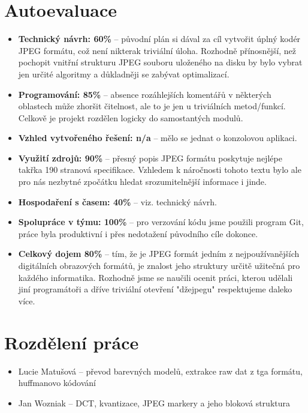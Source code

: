\documentclass[a4paper,11pt]{article}
\begin{document}
\section{Autoevaluace}
\begin{itemize}
\item \textbf{Technický návrh: 60\%} -- původní plán si dával za cíl vytvořit úplný kodér JPEG formátu, což
				není nikterak triviální úloha. Rozhodně přínosnější, než pochopit vnitřní strukturu JPEG
				souboru uloženého na disku by bylo vybrat jen určité algoritmy a důkladněji se zabývat
				optimalizací.
\item \textbf{Programování: 85\%} -- absence rozáhlejších komentářů v některých oblastech může zhoršit čitelnost,
				ale to je jen u triviálních metod/funkcí. Celkově je projekt rozdělen logicky do samostantých
				modulů.
\item \textbf{Vzhled vytvořeného řešení: n/a} -- mělo se jednat o konzolovou aplikaci.
\item \textbf{Využití zdrojů: 90\%} -- přesný popis JPEG formátu poskytuje nejlépe takřka 190 stranová 
				specifikace. Vzhledem k náročnosti tohoto textu bylo ale pro nás nezbytné zpočátku hledat 
				srozumitelnější	informace i jinde.
\item \textbf{Hospodaření s časem: 40\%} -- viz. technický návrh.
\item \textbf{Spolupráce v týmu: 100\%} -- pro verzování kódu jsme použili program Git, práce byla produktivní
				i přes nedotažení původního cíle dokonce.
\item \textbf{Celkový dojem 80\%} -- tím, že je JPEG formát jedním z nejpoužívanějších digitálních obrazových
				formátů, je znalost jeho struktury určitě užitečná pro každého informatika. Rozhodně
				jsme se naučili ocenit práci, kterou udělali jiní programátoři a dříve triviální otevření
				"džejpegu" respektujeme daleko více.
			
\end{itemize}

\section{Rozdělení práce}
\begin{itemize}
\item Lucie Matušová -- převod barevných modelů, extrakce raw dat z tga formátu, huffmanovo kódování
\item Jan Wozniak -- DCT, kvantizace, JPEG markery a jeho bloková struktura
\end{itemize}
\end{document}
